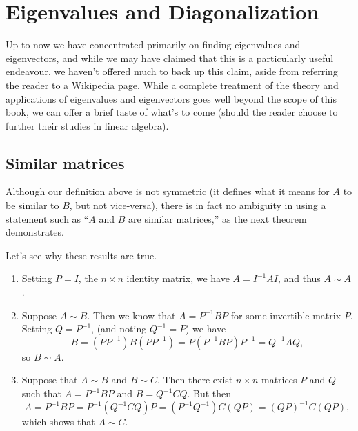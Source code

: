 \section{Eigenvalues and Diagonalization} \label{sec:diagonalization}
Up to now we have concentrated primarily on finding eigenvalues and eigenvectors, and while we may have claimed that this is a particularly useful endeavour, we haven't offered much to back up this claim, aside from referring the reader to a Wikipedia page. While a complete treatment of the theory and applications of eigenvalues and eigenvectors goes well beyond the scope of this book, we can offer a brief taste of what's to come (should the reader choose to further their studies in linear algebra).

\subsection*{Similar matrices}

\smallskip

Although our definition above is not symmetric (it defines what it means for $A$ to be similar to $B$, but not vice-versa), there is in fact no ambiguity in using a statement such as ``$A$ and $B$ are similar matrices,'' as the next theorem demonstrates.

\smallskip


\smallskip

Let's see why these results are true.
 \begin{enumerate}
  \item Setting $P=I$, the $n\times n$ identity matrix, we have $A = I^{-1}AI$, and thus $A\sim A$.
  \item Suppose $A\sim B$. Then we know that $A = P^{-1}BP$ for some invertible matrix $P$. Setting $Q=P^{-1}$, (and noting $Q^{-1} = P$) we have
\[
 B = (PP^{-1})B(PP^{-1}) = P(P^{-1}BP)P^{-1} = Q^{-1}AQ,
\]
so $B\sim A$.
 \item Suppose that $A\sim B$ and $B\sim C$. Then there exist $n\times n$ matrices $P$ and $Q$ such that $A = P^{-1}BP$ and $B=Q^{-1}CQ$. But then
\[
 A = P^{-1}BP = P^{-1}(Q^{-1}CQ)P = (P^{-1}Q^{-1})C(QP) = (QP)^{-1}C(QP),
\]
which shows that $A\sim C$.
 \end{enumerate}



